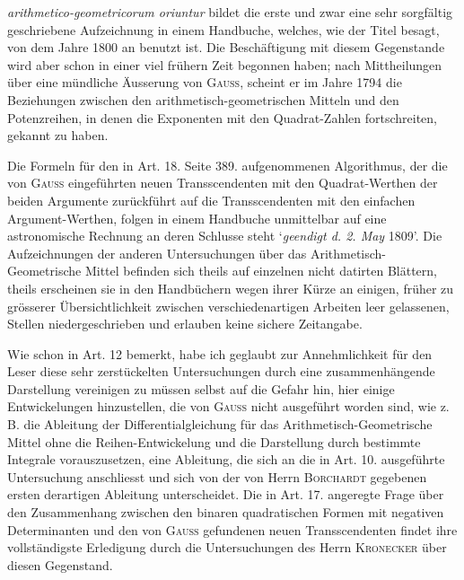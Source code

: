 \providecommand{\TStart}{\hspace*{.5em}}\providecommand{\TCont}{\hspace*{1em}}\providecommand{\TD}{\hspace{.3em}.\hspace{.3em}.}
\textit{arithmetico-geometricorum oriuntur} bildet die erste und zwar eine sehr sorgfältig geschriebene Aufzeichnung in einem Handbuche, welches, wie der Titel besagt, von dem Jahre 1800 an benutzt ist. Die Beschäftigung mit diesem Gegenstande wird aber schon in einer viel frühern Zeit begonnen haben; nach Mittheilungen über eine mündliche Äusserung von \textsc{Gauss}, scheint er im Jahre 1794 die Beziehungen zwischen den arithmetisch-geometrischen Mitteln und den Potenzreihen, in denen die Exponenten mit den Quadrat-Zahlen fortschreiten, gekannt zu haben.

Die Formeln für den in Art. 18. Seite 389. aufgenommenen Algorithmus, der die von \textsc{Gauss} eingeführten neuen Transscendenten mit den Quadrat-Werthen der beiden Argumente zurückführt auf die Transscendenten mit den einfachen Argument-Werthen, folgen in einem Handbuche unmittelbar auf eine astronomische Rechnung an deren Schlusse steht `\textit{geendigt d. 2. May} 1809'. Die Aufzeichnungen der anderen Untersuchungen über das Arithmetisch-Geometrische Mittel befinden sich theils auf einzelnen nicht datirten Blättern, theils erscheinen sie in den Handbüchern wegen ihrer Kürze an einigen, früher zu grösserer Übersichtlichkeit zwischen verschiedenartigen Arbeiten leer gelassenen, Stellen niedergeschrieben und erlauben keine sichere Zeitangabe.

Wie schon in Art. 12 bemerkt, habe ich geglaubt zur Annehmlichkeit für den Leser diese sehr zerstückelten Untersuchungen durch eine zusammenhängende Darstellung vereinigen zu müssen selbst auf die Gefahr hin, hier einige Entwickelungen hinzustellen, die von \textsc{Gauss} nicht ausgeführt worden sind, wie z. B. die Ableitung der Differentialgleichung für das Arithmetisch-Geometrische Mittel ohne die Reihen-Entwickelung und die Darstellung durch bestimmte Integrale vorauszusetzen, eine Ableitung, die sich an die in Art. 10. ausgeführte Untersuchung anschliesst und sich von der von Herrn \textsc{Borchardt} gegebenen ersten derartigen Ableitung unterscheidet. Die in Art. 17. angeregte Frage über den Zusammenhang zwischen den binaren quadratischen Formen mit negativen Determinanten und den von \textsc{Gauss} gefundenen neuen Transscendenten findet ihre vollständigste Erledigung durch die Untersuchungen des Herrn \textsc{Kronecker} über diesen Gegenstand.

